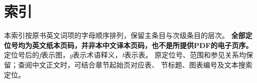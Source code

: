 \chapter*{索引}
本索引按原书英文词项的字母顺序排列，保留主条目与次级条目的层次。
\textbf{全部定位号均为英文纸本页码，并非本中文译本页码，也不是所提供PDF的电子页序。}
定位号后的\textit{f}表示图，\textit{g}表示术语释义，\textit{t}表示表。
原定位号、范围和参见关系均保留；查阅中文正文时，可结合章节起始页对应表、
节标题、图表编号及文本搜索定位。
\par\medskip

\providecommand{\idxletter}[1]{\par\addvspace{10pt}{\large\bfseries\color{dcrteal}#1\par}\nobreak}
\providecommand{\idxentry}[4]{\par\begingroup
\leftskip=#1em\relax
\parindent=0pt\hangindent=1em\hangafter=1
\ifnum#1=0\relax\addvspace{3pt}\fi
\noindent\ifnum#1=0\relax\textbf{#2}\else#2\fi
\ifstrempty{#3}{}{（#3）}%
\ifstrempty{#4}{}{，#4}\par\endgroup}
\begingroup\fontsize{9.5}{13.5}\selectfont\setlength{\parskip}{1pt}


\endgroup
